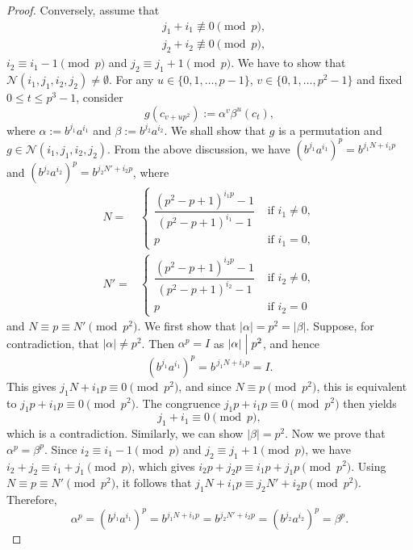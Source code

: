 \documentclass[11pt]{amsart}
\theoremstyle{plain}
\numberwithin{equation}{section}
\begin{document}
\begin{proof}
Conversely, assume that \begin{equation*}
\begin{split}
& j_1+i_1 \not \equiv  0  \pmod p,\\& 
  j_2 +i_2\not \equiv  0 \pmod p,
\end{split}
\end{equation*}
 $i_2\equiv i_1-1 \pmod  p$ and $j_2 \equiv j_1+1 \pmod  p$. We have to show that $\mathcal{N}(i_1,j_1,i_2,j_2) \neq \emptyset$.  
For any $u \in \{0,1,\ldots,p-1\}$, $v \in \{0,1,\ldots,p^2-1\}$ and fixed $ 0 \leq t \leq p^3-1$, consider 
 \begin{equation}\label{tempe3}
 g(c_{v+up^2}):=\alpha^{v}\beta^{u}(c_t),
 \end{equation}
 where $\alpha:=b^{j_1}a^{i_1}$ and $\beta:=b^{j_2}a^{i_2}$. We shall show that $g$ is a permutation and $g \in \mathcal{N}(i_1,j_1,i_2,j_2)$. From the above discussion, we have $(b^{j_1}a^{i_1})^p=b^{j_1N+i_1p}$ and $ (b^{j_2}a^{i_2})^p=b^{j_2N'+i_2p}$, where 
$$
\begin{aligned}
N=&\begin{cases} \dfrac{(p^2-p+1)^{i_1p}-1}{(p^2-p+1)^{i_1}-1} & \text{ if } i_1 \neq 0,\\p 
 & \text{ if } i_1=0, \end{cases}\\
N'=&\begin{cases} \dfrac{(p^2-p+1)^{i_2p}-1}{(p^2-p+1)^{i_2}-1} & \text{ if } i_2 \neq 0,\\p 
 & \text{ if } i_2=0\end{cases}
 \end{aligned}$$
  and $N \equiv p \equiv N' \pmod {p^2}$. We first show that $|\alpha|=p^2=|\beta|$.
  Suppose, for contradiction, that $|\alpha|\neq p^{2}$. Then $\alpha^{p}=I$ as $|\alpha| \Bigm| p^2$, and hence
\[
(b^{j_1}a^{i_1})^{p}=b^{\,j_1N+i_1p}=I.
\]
This gives $j_1N+i_1p \equiv 0 \pmod{p^{2}}$, and since $N \equiv p \pmod{p^{2}}$,
this is equivalent to
$
j_1p+i_1p \equiv 0 \pmod{p^{2}}.
$
The congruence $j_1p+i_1p \equiv 0 \pmod{p^{2}}$ then yields
\[
j_1+i_1 \equiv 0 \pmod{p},
\]
which is a contradiction. Similarly, we can show $|\beta|=p^2$. Now we prove that $\alpha^p=\beta^p$. Since $i_2\equiv i_1-1 \pmod  p$ and $j_2 \equiv j_1+1 \pmod  p$, we have $i_2+j_2 \equiv i_1+j_1 \pmod  p$, which gives  $i_2p+j_2p \equiv i_1p+j_1p \pmod {p^2}$. Using $N \equiv p \equiv N' \pmod {p^2}$, it follows that  $j_1N+i_1p \equiv j_2N'+i_2p \pmod {p^2}$. Therefore, 
$$\alpha^p=(b^{j_1}a^{i_1})^p=b^{j_1N+i_1p}=b^{j_2N'+i_2p}=(b^{j_2}a^{i_2})^p=\beta^p.$$

\end{proof}
\end{document}
